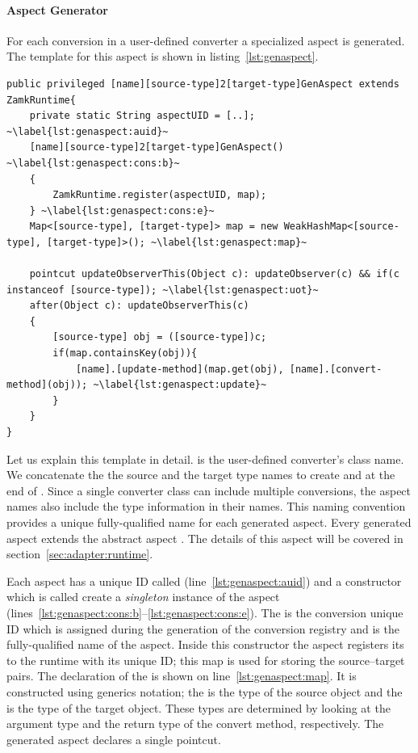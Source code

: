 \paragraph{Aspect Generator}
For each conversion in a user-defined converter a specialized aspect is generated. The template for this aspect is shown in listing~\ref{lst:genaspect}. 


\begin{lstlisting}[float, caption={The code generation template for producing an adaptation-specific aspect}, label={lst:genaspect}]
public privileged [name][source-type]2[target-type]GenAspect extends ZamkRuntime{
	private static String aspectUID = [..]; ~\label{lst:genaspect:auid}~
	[name][source-type]2[target-type]GenAspect() ~\label{lst:genaspect:cons:b}~
	{
		ZamkRuntime.register(aspectUID, map);
	} ~\label{lst:genaspect:cons:e}~
	Map<[source-type], [target-type]> map = new WeakHashMap<[source-type], [target-type]>(); ~\label{lst:genaspect:map}~
	
	pointcut updateObserverThis(Object c): updateObserver(c) && if(c instanceof [source-type]); ~\label{lst:genaspect:uot}~
	after(Object c): updateObserverThis(c)
	{
		[source-type] obj = ([source-type])c;
		if(map.containsKey(obj)){
			[name].[update-method](map.get(obj), [name].[convert-method](obj)); ~\label{lst:genaspect:update}~
		}	
	}
}
\end{lstlisting}




Let us explain this template in detail. 
\lstinln{[name]} is the user-defined converter's class name. We concatenate the the source and the target type names to create  and  at the end of \lstinln{[name]}. Since a single converter class can include multiple conversions, the aspect names also include the type information in their names.
This naming convention provides a unique fully-qualified name for each  generated aspect.
Every generated aspect extends the abstract aspect . 
The details of this aspect will be covered in section~\ref{sec:adapter:runtime}.

Each aspect has a unique ID called  (line~\ref{lst:genaspect:auid}) and a constructor which is called create a \emph{singleton} instance of the aspect (lines~\ref{lst:genaspect:cons:b}--\ref{lst:genaspect:cons:e}). 
The  is the conversion unique ID which is assigned during the generation of the conversion registry and is the fully-qualified name of the aspect. 
Inside this constructor the aspect registers its  to the \zamk runtime with its unique ID; this map is used for storing the source--target pairs. The declaration of the   is shown on line~\ref{lst:genaspect:map}. 
It is constructed using generics notation; the  is the type of the source object and the  is the type of the target object. These types are determined by looking at the argument type and the return type of the convert method, respectively. 
The generated aspect declares a single pointcut.

